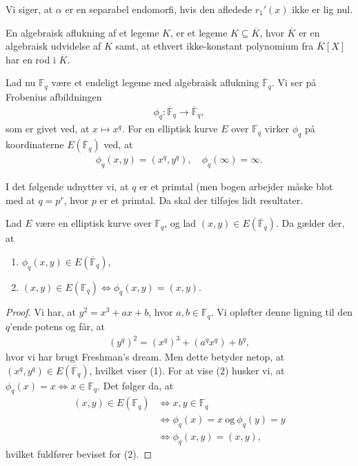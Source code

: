 Vi siger, at $\alpha$ er en separabel endomorfi, hvis den afledede $r_1'(x)$ ikke
er lig nul.


\begin{definition}
En algebraisk aflukning af et legeme $K$, er et legeme
$K \subseteq \overline{K}$, hvor $\overline{K}$ er en 
algebraisk udvidelse af $K$ samt, at ethvert ikke-konstant
polynomium fra $\overline{K}[X]$ har en rod i $\overline{K}$. 
\end{definition}






Lad nu $\mathbb{F}_q$ være et endeligt
legeme med algebraisk aflukning $\overline{\mathbb{F}}_q$. Vi ser på
Frobenius afbildningen 
\begin{align*}
	\phi_q : \overline{\mathbb{F}}_q \to \overline{\mathbb{F}}_q,
\end{align*}
som er givet ved, at $x \mapsto x^q$. For en elliptisk kurve $E$ over
$\mathbb{F}_q$ virker $\phi_q$ på koordinaterne $E(\overline{\mathbb{F}}_q)$ 
ved, at 
\begin{align*}
	\phi_q(x, y) = (x^q, y^q), \quad \phi_q (\infty) = \infty.
\end{align*}

I det følgende udnytter vi, at $q$ er et primtal (men bogen arbejder
måske blot med at $q = p^r$, hvor $p$ er et primtal. Da skal der tilføjes
lidt resultater.

\begin{lemma}\label{lemma03}
Lad $E$ være en elliptisk kurve over $\mathbb{F}_q$, og lad 
$(x, y) \in E(\overline{\mathbb{F}}_q)$. Da gælder der, at 
\begin{enumerate}
	\item $\phi_q(x, y) \in E(\overline{\mathbb{F}}_q)$,
	\item $(x, y) \in E(\mathbb{F}_q) \Leftrightarrow \phi_q(x, y)=(x, y)$.
\end{enumerate}
\end{lemma}
\begin{proof}
Vi har, at $y^2 = x^3 + ax + b$, hvor $a, b \in \mathbb{F}_q$. Vi opløfter 
denne ligning til den $q$'ende potens og får, at 
\begin{align*}
	(y^q)^2 = (x^q)^3 + (a^q x^q) + b^q,
\end{align*}
hvor vi har brugt Freshman's dream. Men dette betyder netop, at 
$(x^q, y^q) \in E(\overline{\mathbb{F}}_q)$, hvilket viser (1).
For at vise (2) husker vi, at $\phi_q(x) = x \Leftrightarrow x \in \mathbb{F}_q$.
Det følger da, at 
\begin{align*}
	(x, y) \in E(\mathbb{F}_q) &\Leftrightarrow x, y \in \mathbb{F}_q \\
	&\Leftrightarrow \phi_q(x) = x \ \text{og} \ \phi_q(y) = y \\
	&\Leftrightarrow \phi_q(x, y) = (x, y),
\end{align*}
hvilket fuldfører beviset for (2).
\end{proof}

